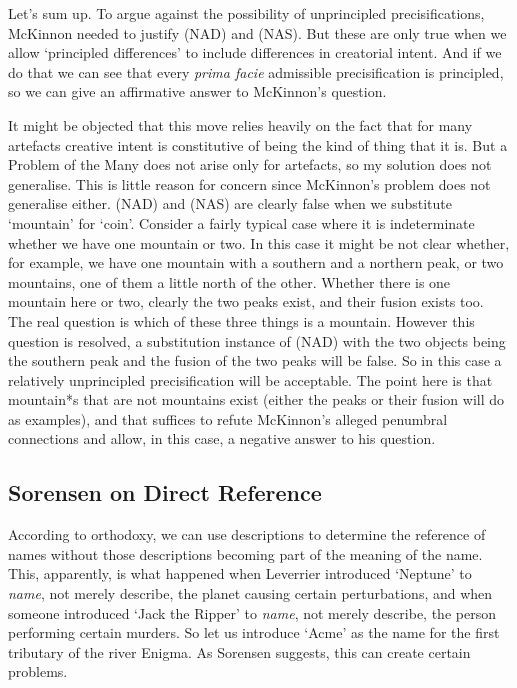 \documentclass[
  11pt,
  letterpaper,
  DIV=11,
  numbers=noendperiod,
  oneside]{scrartcl}
\begin{document}
Let's sum up. To argue against the possibility of unprincipled
precisifications, McKinnon needed to justify (NAD) and (NAS). But these
are only true when we allow `principled differences' to include
differences in creatorial intent. And if we do that we can see that
every \emph{prima facie} admissible precisification is principled, so we
can give an affirmative answer to McKinnon's question.

It might be objected that this move relies heavily on the fact that for
many artefacts creative intent is constitutive of being the kind of
thing that it is. But a Problem of the Many does not arise only for
artefacts, so my solution does not generalise. This is little reason for
concern since McKinnon's problem does not generalise either. (NAD) and
(NAS) are clearly false when we substitute `mountain' for `coin'.
Consider a fairly typical case where it is indeterminate whether we have
one mountain or two. In this case it
might be not clear whether, for example, we have one mountain with a
southern and a northern peak, or two mountains, one of them a little
north of the other. Whether there is one mountain here or two, clearly
the two peaks exist, and their fusion exists too. The real question is
which of these three things is a mountain. However this question is
resolved, a substitution instance of (NAD) with the two objects being
the southern peak and the fusion of the two peaks will be false. So in
this case a relatively unprincipled precisification will be acceptable.
The point here is that mountain*s that are not mountains exist (either
the peaks or their fusion will do as examples), and that suffices to
refute McKinnon's alleged penumbral connections and allow, in this case,
a negative answer to his question.

\subsection{Sorensen on Direct
Reference}\label{sorensen-on-direct-reference}

According to orthodoxy, we can use descriptions to determine the
reference of names without those descriptions becoming part of the
meaning of the name. This, apparently, is what happened when Leverrier
introduced `Neptune' to \emph{name}, not merely describe, the planet
causing certain perturbations, and when someone introduced `Jack the
Ripper' to \emph{name}, not merely describe, the person performing
certain murders. So let us introduce `Acme' as the name for the first
tributary of the river Enigma. As Sorensen suggests, this can create
certain problems.
\end{document}
